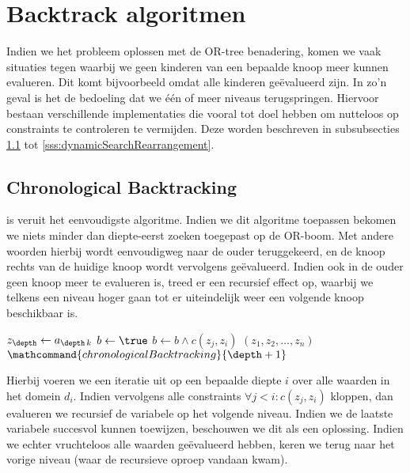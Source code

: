 \section{Backtrack algoritmen}
\label{ss:backtrackingsAlgorithms}
Indien we het probleem oplossen met de OR-tree benadering, komen we vaak situaties tegen waarbij we geen kinderen van een bepaalde knoop meer kunnen evalueren. Dit komt bijvoorbeeld omdat alle kinderen ge\"evalueerd zijn. In zo'n geval is het de bedoeling dat we \'e\'en of meer niveaus terugspringen. Hiervoor bestaan verschillende implementaties die vooral tot doel hebben om nutteloos op constraints te controleren te vermijden. Deze worden beschreven in subsubsecties \ref{sss:chronolgicalBacktracking} tot \ref{sss:dynamicSearchRearrangement}.
\subsection{Chronological Backtracking}
\label{sss:chronolgicalBacktracking}
 is veruit het eenvoudigste algoritme. Indien we dit algoritme toepassen bekomen we niets minder dan diepte-eerst zoeken toegepast op de OR-boom. Met andere woorden hierbij wordt eenvoudigweg naar de ouder teruggekeerd, en de knoop rechts van de huidige knoop wordt vervolgens ge\"evalueerd. Indien ook in de ouder geen knoop meer te evalueren is, treed er een recursief effect op, waarbij we telkens een niveau hoger gaan tot er uiteindelijk weer een volgende knoop beschikbaar is.
\begin{algorithm}[htb]                      %
\caption{$\mathcommand{chronologicalBacktracking}{\depth}$}          %
\label{alg:chronologicalBacktracking}                           %
\begin{algorithmic}[1]                    %
\STATE{}
\STATE$z_{\depth}\leftarrow a_{\depth\,k}$
\STATE$b\leftarrow\true$
\STATE{}
\STATE $b\leftarrow b\wedge c\left(z_j,z_i\right)$
\ENDFOR
{}
\STATE{}
\STATE{}
\RETURN$\left(z_1,z_2,\ldots,z_n\right)$
\ELSE
\STATE{}
\STATE$\mathcommand{chronologicalBacktracking}{\depth+1}$
\ENDIF
\ENDIF
\ENDFOR
\end{algorithmic}
\end{algorithm}
Hierbij voeren we een iteratie uit op een bepaalde diepte $i$ over alle waarden in het domein $d_i$. Indien vervolgens alle constraints $\forall j<i:c\left(z_j,z_i\right)$ kloppen, dan evalueren we recursief de variabele op het volgende niveau. Indien we de laatste variabele succesvol kunnen toewijzen, beschouwen we dit als een oplossing. Indien we echter vruchteloos alle waarden ge\"evalueerd hebben, keren we terug naar het vorige niveau (waar de recursieve oproep vandaan kwam).
